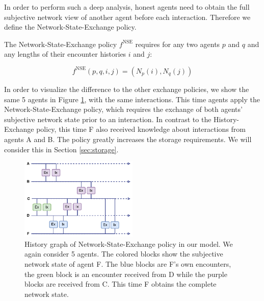 In order to perform such a deep analysis, honest agents need to obtain the full subjective network 
view of another agent before each interaction. Therefore we define the Network-State-Exchange policy.

\begin{pol}
    \label{pol:network_state}

    The Network-State-Exchange policy $f^{\text{NSE}}$ requires for 
    any two agents $p$ and $q$ and any lengths of their encounter histories $i$ and $j$:

    \begin{equation}
        f^{\text{NSE}}(p,q,i,j) = (N_p(i), N_q(j))
    \end{equation}
\end{pol}

In order to visualize the difference to the other exchange policies, we show the same 5 agents in Figure \ref{fig:network_state_exchange}, 
with the same interactions. This time agents apply the Network-State-Exchange policy, which requires
the exchange of both agents' subjective network state prior to an interaction. In contrast to the 
History-Exchange policy, this time F also received knowledge about interactions from agents A and B.
The policy greatly increases the storage requirements. We will consider this in Section \ref{sec:storage}.

\begin{figure}
    \centering
    \includegraphics[width=0.5\textwidth]{images/network_state_exchange.pdf}
    \caption{History graph of Network-State-Exchange policy in our model. We again consider 5 agents. The 
    colored blocks show the subjective network state of agent F. The blue blocks are F's own encounters,
    the green block is an encounter received from D while the purple blocks are received from C. This
    time F obtains the complete network state.}
    \label{fig:network_state_exchange}
\end{figure}

